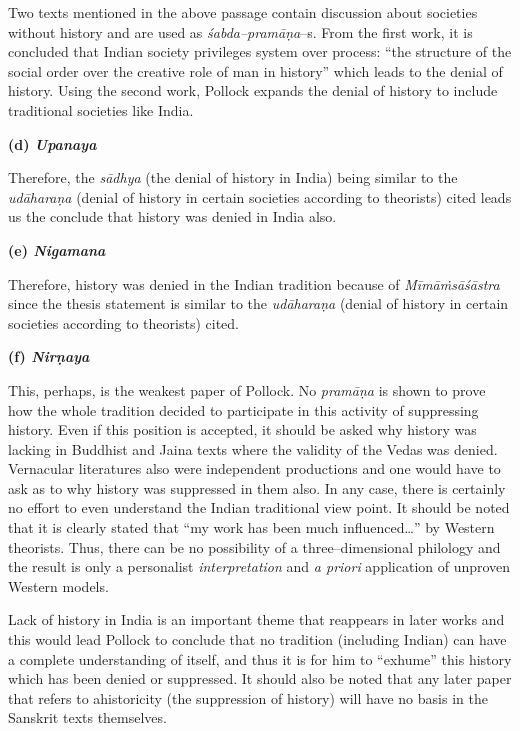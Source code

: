 Two texts mentioned in the above passage contain discussion about societies without history and are used as \textit{śabda–pramāṇa}–s. From the first work, it is concluded that Indian society privileges system over process: “the structure of the social order over the creative role of man in history” which leads to the denial of history. Using the second work, Pollock expands the denial of history to include traditional societies like India.

\textbf{(d) \textit{Upanaya}}

Therefore, the \textit{sādhya} (the denial of history in India) being similar to the \textit{udāharaṇa} (denial of history in certain societies according to theorists) cited leads us the conclude that history was denied in India also.

\textbf{(e) \textit{Nigamana}}

Therefore, history was denied in the Indian tradition because of \textit{Mīmāṁsāśāstra} since the thesis statement is similar to the \textit{udāharaṇa} (denial of history in certain societies according to theorists) cited.

\textbf{(f) \textit{Nirṇaya}}

This, perhaps, is the weakest paper of Pollock. No \textit{pramāṇa} is shown to prove how the whole tradition decided to participate in this activity of suppressing history. Even if this position is accepted, it should be asked why history was lacking in Buddhist and Jaina texts where the validity of the Vedas was denied. Vernacular literatures also were independent productions and one would have to ask as to why history was suppressed in them also. In any case, there is certainly no effort to even understand the Indian traditional view point. It should be noted that it is clearly stated that “my work has been much influenced…” by Western theorists. Thus, there can be no possibility of a three–dimensional philology and the result is only a personalist \textit{interpretation} and \textit{a priori} application of unproven Western models.

Lack of history in India is an important theme that reappears in later works and this would lead Pollock to conclude that no tradition (including Indian) can have a complete understanding of itself, and thus it is for him to “exhume” this history which has been denied or suppressed. It should also be noted that any later paper that refers to ahistoricity (the suppression of history) will have no basis in the Sanskrit texts themselves.


